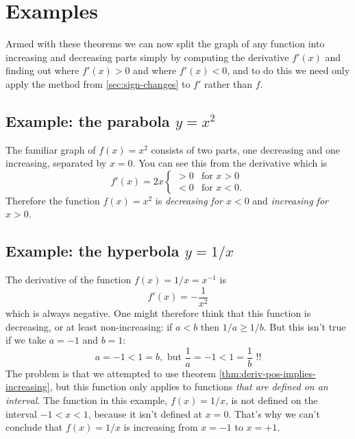 \section{Examples} %
Armed with these theorems we can now split the graph of any function into
increasing and decreasing parts simply by computing the derivative $f'(x)$ and
finding out where $f'(x)>0$ and where $f'(x)<0$, and to do this we need only apply the method
  from \ref{sec:sign-changes} to $f'$ rather than $f$.




\subsection{Example: the parabola $y=x^2$} %
The familiar graph of $f(x)=x^2$ consists of two parts, one decreasing and one
increasing, separated by $x=0$.  You can see this from the derivative which is
\[
f'(x) = 2x
\begin{cases}
  >0 & \text{for $x>0$} \\
  <0 & \text{for $x<0$.}
\end{cases}
\]
Therefore the function $f(x) = x^2$ is \emph{decreasing for $x<0$} and
\emph{increasing for $x>0$.}


\begin{figure}[h]
  \centering
  \parbox{170pt}{}
  \quad
  \parbox{170pt}{}
\end{figure}




\subsection{Example: the hyperbola $ y=1/x $} %
The derivative of the function $f(x)= 1/x = x^{-1}$ is
\[
f'(x) = -\frac{1}{x^2}
\]
which is always negative.  One might therefore think that this function is
decreasing, or at least non-increasing: if $a<b$ then $1/a \geq 1/b$.  But this
isn't true if we take $a=-1$ and $b=1$:
\[
a=-1<1=b, \text{ but } \frac{1}{a} = -1 < 1 = \frac{1}{b}\text{ !!}
\]
The problem is that we attempted to use theorem
\ref{thm:deriv-pos-implies-increasing}, but this function only applies to
functions \emph{that are defined on an interval}.  The function in this example,
$f(x)=1/x$, is not defined on the interval $-1<x<1$, because it isn't defined at
$x=0$.  That's why we can't conclude that $f(x) = 1/x$ is increasing from $x=-1$
to $x=+1$.




